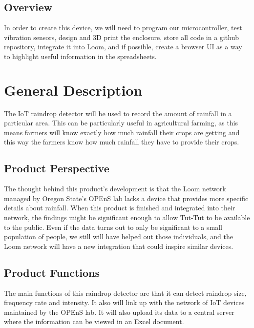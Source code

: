 \documentclass[letterpaper,10pt,draftclsnofoot,onecolumn]{article}
\begin{document}
\subsection{Overview}
In order to create this device, we will need to program our microcontroller, test vibration sensors, design and 3D print the enclosure, store all code in a github repository, integrate it into Loom, and if possible, create a browser UI as a way to highlight useful information in the spreadsheets.

\section{General Description}
The IoT raindrop detector will be used to record the amount of rainfall in a particular area. This can be particularly useful in agricultural farming, as this means farmers will know exactly how much rainfall their crops are getting and this way the farmers know how much rainfall they have to provide their crops. 

\subsection{Product Perspective}
The thought behind this product's development is that the Loom network managed by Oregon State's OPEnS lab lacks a device that provides more specific details about rainfall. When this product is finished and integrated into their network, the findings might be significant enough to allow Tut-Tut to be available to the public. Even if the data turns out to only be significant to a small population of people, we still will have helped out those individuals, and the Loom network will have a new integration that could inspire similar devices.

\subsection{Product Functions}
The main functions of this raindrop detector are that it can detect raindrop size, frequency rate and intensity. It also will link up with the network of IoT devices maintained by the OPEnS lab. It will also upload its data to a central server where the information can be viewed in an Excel document.
\end{document}
